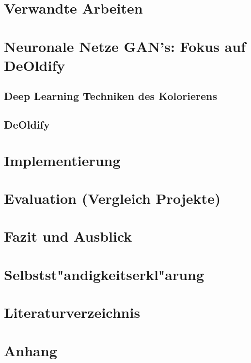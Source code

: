 \documentclass[12pt,titlepage]{article}
\begin{document}


  

    \pagebreak
\section{Verwandte Arbeiten}
    \pagebreak

\section{Neuronale Netze GAN's: Fokus auf DeOldify}
\subsection{Deep Learning Techniken des Kolorierens}

    \pagebreak

\subsection{DeOldify}
    \pagebreak

\section{Implementierung}

    \pagebreak

\section{Evaluation (Vergleich Projekte)}
    \pagebreak

\section{Fazit und Ausblick}

    \pagebreak

\section{Selbstst"andigkeitserkl"arung}
    \pagebreak

\section{Literaturverzeichnis}
 \printbibliography
    \pagebreak
    
\section{Anhang}
\end{document}
